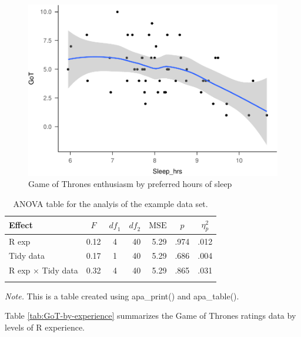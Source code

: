 \documentclass[english,man]{apa6}
\theoremstyle{definition}
\theoremstyle{definition}
\theoremstyle{remark}
\begin{document}
\begin{figure}
\centering
\includegraphics{gilmore-lebreton-hallquist_files/figure-latex/GoT-by-sleep-1.pdf}
\caption{\label{fig:GoT-by-sleep}Game of Thrones enthusiasm by preferred
hours of sleep}
\end{figure}

\begin{table}[tbp]
\begin{center}
\begin{threeparttable}
\caption{\label{tab:GoT-aov-table}ANOVA table for the analyis of the example data set.}
\begin{tabular}{lrcrrrl}
\toprule
Effect & \multicolumn{1}{c}{$F$} & \multicolumn{1}{c}{$\mathit{df}_1$} & \multicolumn{1}{c}{$\mathit{df}_2$} & \multicolumn{1}{c}{$\mathrm{MSE}$} & \multicolumn{1}{c}{$p$} & \multicolumn{1}{c}{$\eta^2_p$}\\
\midrule
R exp & 0.12 & 4 & 40 & 5.29 & .974 & .012\\
Tidy data & 0.17 & 1 & 40 & 5.29 & .686 & .004\\
R exp $\times$ Tidy data & 0.32 & 4 & 40 & 5.29 & .865 & .031\\
\bottomrule
\addlinespace
\end{tabular}
\begin{tablenotes}[para]
\textit{Note.} This is a table created using apa\_print() and apa\_table().
\end{tablenotes}
\end{threeparttable}
\end{center}
\end{table}

Table \ref{tab:GoT-by-experience} summarizes the Game of Thrones ratings
data by levels of R experience.
\end{document}
